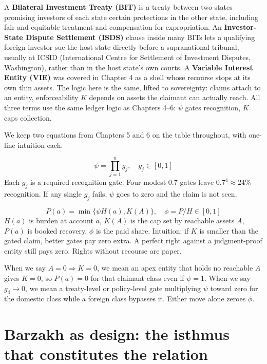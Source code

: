 A \textbf{Bilateral Investment Treaty (BIT)} is a treaty between two states promising investors of each state certain protections in the other state, including fair and equitable treatment and compensation for expropriation. An \textbf{Investor-State Dispute Settlement (ISDS)} clause inside many BITs lets a qualifying foreign investor sue the host state directly before a supranational tribunal, usually at ICSID (International Centre for Settlement of Investment Disputes, Washington), rather than in the host state's own courts. A \textbf{Variable Interest Entity (VIE)} was covered in Chapter 4 as a shell whose recourse stops at its own thin assets. The logic here is the same, lifted to sovereignty: claims attach to an entity, enforceability $K$ depends on assets the claimant can actually reach. All three terms use the same ledger logic as Chapters 4--6: $\psi$ gates recognition, $K$ caps collection.

We keep two equations from Chapters 5 and 6 on the table throughout, with one-line intuition each.

\begin{equation}
\psi = \prod_{j=1}^{n} g_j,\quad g_j \in [0,1] \label{eq:psi-ch7}
\end{equation}
Each $g_j$ is a required recognition gate. Four modest $0.7$ gates leave $0.7^4 \approx 24\%$ recognition. If any single $g_j$ fails, $\psi$ goes to zero and the claim is not seen.

\begin{equation}
P(a) = \min\{\psi H(a), K(A)\},\quad \phi = P/H \in [0,1] \label{eq:PK-ch7}
\end{equation}
$H(a)$ is burden at account $a$, $K(A)$ is the cap set by reachable assets $A$, $P(a)$ is booked recovery, $\phi$ is the paid share. Intuition: if $K$ is smaller than the gated claim, better gates pay zero extra. A perfect right against a judgment-proof entity still pays zero. Rights without recourse are paper.

When we say $A=0 \Rightarrow K=0$, we mean an apex entity that holds no reachable $A$ gives $K=0$, so $P(a)=0$ for that claimant class even if $\psi=1$. When we say $g_4 \to 0$, we mean a treaty-level or policy-level gate multiplying $\psi$ toward zero for the domestic class while a foreign class bypasses it. Either move alone zeroes $\phi$.

\section{Barzakh as design: the isthmus that constitutes the relation}
\label{sec:barzakh-sovereign}

